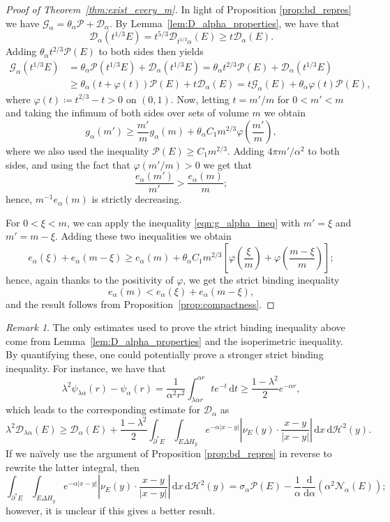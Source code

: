 \documentclass[a4paper,11pt,reqno]{amsart}
\numberwithin{equation}{section}
\theoremstyle{remark}
\newtheorem{remark}[theorem]{Remark}
\theoremstyle{definition}
\newcommand{\dd}{\,\mathrm{d}}
\newcommand{\defeq}{\coloneqq}
\newcommand{\eng}{\mathcal{G}_{\alpha}}
\newcommand{\nl}{\mathcal{N}_{\alpha}}
\renewcommand{\geq}{\geqslant}
\newcommand{\calD}{\mathcal{D}}
\newcommand{\Pe}{\mathcal{P}}
\begin{document}
\begin{proof}[Proof of Theorem~\ref{thm:exist_every_m}] In light of Proposition \ref{prop:bd_repres} we have $\eng=\theta_\alpha \Pe + \calD_\alpha$. By Lemma~\ref{lem:D_alpha_properties}, we have that
	\[
		\calD_\alpha(t^{1/3}E) = t^{5/3}\calD_{t^{1/3}\alpha}(E) \geq t\calD_\alpha(E).
	\]
Adding $\theta_\alpha t^{2/3}\Pe(E)$ to both sides then yields
	\begin{align*}
		\eng(t^{1/3}E) &= \theta_\alpha \Pe(t^{1/3}E) + \calD_\alpha(t^{1/3}E) = \theta_\alpha t^{2/3}\Pe(E) + \calD_\alpha(t^{1/3}E) \\
					   &\geq \theta_\alpha(t+\varphi(t))\Pe(E) + t\calD_\alpha(E) = t\eng(E)+\theta_\alpha\varphi(t)\Pe(E),
	\end{align*}
where $\varphi(t)\defeq t^{2/3}-t>0$ on $(0,1)$. Now, letting $t=m'/m$ for $0<m'<m$ and taking the infimum of both sides over sets of volume $m$ we obtain
	\begin{equation}\label{eqn:g_alpha_ineq}
		g_\alpha(m') \geq \frac{m'}{m}g_\alpha(m) + \theta_\alpha C_1 m^{2/3}\varphi\left(\frac{m'}{m}\right),
	\end{equation}
where we also used the inequality $\Pe(E) \geq C_1 m^{2/3}$. Adding $4\pi m'/\alpha^2$ to both sides, and using the fact that $\varphi(m'/m)>0$ we get that
	\[
		\frac{e_\alpha(m')}{m'} > \frac{e_\alpha(m)}{m};
	\]
hence, $m^{-1}e_\alpha(m)$ is strictly decreasing.

For $0<\xi<m$, we can apply the inequality \eqref{eqn:g_alpha_ineq} with $m'=\xi$ and $m'=m-\xi$. Adding these two inequalities we obtain
	\[
		e_\alpha(\xi) + e_\alpha(m-\xi) \geq e_\alpha(m) + \theta_\alpha C_1 m^{2/3}\left[\varphi\left(\frac{\xi}{m}\right)+\varphi\left(\frac{m-\xi}{m}\right)\right];
	\]
hence, again thanks to the positivity of $\varphi$, we get the strict binding inequality
	\[	
		e_\alpha(m) < e_\alpha(\xi) + e_\alpha(m-\xi),
	\]
and the result follows from Proposition~\ref{prop:compactness}.
\end{proof}

\begin{remark} The only estimates used to prove the strict binding inequality above come from Lemma~\ref{lem:D_alpha_properties} and the isoperimetric inequality. By quantifying these, one could potentially prove a stronger strict binding inequality. For instance, we have that 
	\[
		\lambda^2\psi_{\lambda\alpha}(r)-\psi_{\alpha}(r) = \frac{1}{\alpha^2r^2}\int_{\lambda\alpha r}^{\alpha r} te^{-t} \dd t \geq \frac{1-\lambda^2}{2}e^{-\alpha r},
	\]
which leads to the corresponding estimate for $\calD_{\alpha}$ as
	\[
		\lambda^2\calD_{\lambda \alpha}(E)\geq \calD_{\alpha}(E)+\frac{1-\lambda^2}{2}\int_{\partial^*E}\int_{E\Delta H_y} e^{-\alpha |x-y|} \left|\nu_E(y)\cdot \frac{x-y}{|x-y|}\right| \dd x\dd \mathcal{H}^2(y).
	\]
If we na\"{i}vely use the argument of Proposition \ref{prop:bd_repres} in reverse to rewrite the latter integral, then 
	\[
		\int_{\partial^*E}\int_{E\Delta H_y} e^{-\alpha |x-y|} \left|\nu_E(y)\cdot \frac{x-y}{|x-y|}\right| \dd x\dd \mathcal{H}^2(y) = \sigma_{\alpha}\Pe(E)-\frac{1}{\alpha}\frac{\dd}{\dd \alpha}\left(\alpha^2\nl(E)\right);
	\]	
however, it is unclear if this gives a better result. 
\end{remark}
\end{document}
